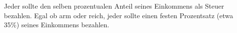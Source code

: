 Jeder sollte den selben prozentualen Anteil seines Einkommens als Steuer bezahlen.
Egal ob arm oder reich, jeder sollte einen festen Prozentsatz (etwa 35\%) seines Einkommens bezahlen.